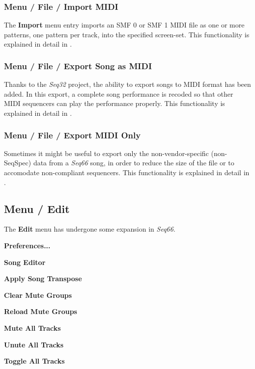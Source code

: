\subsubsection{Menu / File / Import MIDI}
\label{subsubsec:menu_file_import}

   The \textbf{Import} menu entry imports an SMF 0
   or SMF 1 MIDI file as one or more patterns, one pattern per track,
   into the specified screen-set.
   This functionality is explained in detail in
   .

\subsubsection{Menu / File / Export Song as MIDI}
\label{subsubsec:menu_file_export}

   Thanks to the \textsl{Seq32} project, the ability to export songs to MIDI
   format has been added.  In this export, a complete song performance is
   recoded so that other MIDI sequencers can play the performance properly.
   This functionality is explained in detail in
   .

\subsubsection{Menu / File / Export MIDI Only}
\label{subsubsec:menu_file_export_midi_only}

   Sometimes it might be useful to export only the non-vendor-specific
   (non-SeqSpec) data from a \textsl{Seq66} song, in order to reduce the
   size of the file or to accomodate non-compliant sequencers.
   This functionality is explained in detail in
   .

\subsection{Menu / Edit}
\label{subsec:menu_edit}

   The \textbf{Edit} menu has undergone some expansion in \textsl{Seq66}.

   \begin{enumber}
      \item \textbf{Preferences...}
      \item \textbf{Song Editor}
      \item \textbf{Apply Song Transpose}
      \item \textbf{Clear Mute Groups}
      \item \textbf{Reload Mute Groups}
      \item \textbf{Mute All Tracks}
      \item \textbf{Unute All Tracks}
      \item \textbf{Toggle All Tracks}
   \end{enumber}

